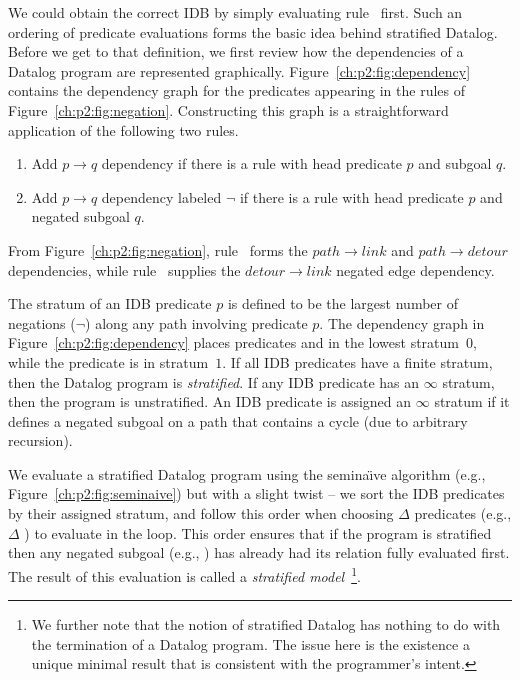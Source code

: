 We could obtain the correct IDB by simply evaluating rule~ first.  Such
an ordering of predicate evaluations forms the basic idea behind stratified
Datalog.  Before we get to that definition, we first review how the
dependencies of a Datalog program are represented graphically.
Figure~\ref{ch:p2:fig:dependency} contains the dependency graph for the
predicates appearing in the rules of Figure~\ref{ch:p2:fig:negation}.
Constructing this graph is a straightforward application of the following two
rules.
\begin{enumerate}
  \ssp
  \item Add $p \rightarrow q$ dependency if there is a rule with head predicate $p$ and subgoal $q$.
  \item Add $p \rightarrow q$ dependency labeled $\neg$ if there is a rule with head predicate $p$ and negated subgoal $q$.
\end{enumerate}
From Figure~\ref{ch:p2:fig:negation}, rule~ forms the $path \rightarrow
link$ and $path \rightarrow detour$ dependencies, while rule~ supplies the
$detour \rightarrow link$ negated edge dependency. 

The stratum of an IDB predicate $p$ is defined to be the largest number of
negations ($\neg$) along any path involving predicate $p$.  The dependency graph
in Figure~\ref{ch:p2:fig:dependency} places predicates  and
 in the lowest stratum~$0$, while the  predicate is in
stratum~$1$.  If all IDB predicates have a finite stratum, then the Datalog
program is {\em stratified}.  If any IDB predicate has an $\infty$ stratum,
then the program is unstratified.  An IDB predicate is assigned an $\infty$
stratum if it defines a negated subgoal on a path that contains a cycle (due
to arbitrary recursion).

We evaluate a stratified Datalog program using the semina\"{\i}ve algorithm
(e.g., Figure~\ref{ch:p2:fig:seminaive}) but with a slight twist -- we sort the
IDB predicates by their assigned stratum, and follow this order when choosing
$\Delta$ predicates (e.g., $\Delta$ ) to evaluate in the loop.  This
order ensures that if the program is stratified then any negated subgoal (e.g.,
) has already had its relation fully evaluated first.  The result of
this evaluation is called a {\em stratified model}~\footnote{We further note
that the notion of stratified Datalog has nothing to do with the termination of
a Datalog program.  The issue here is the existence a unique minimal result
that is consistent with the programmer's intent.}.

